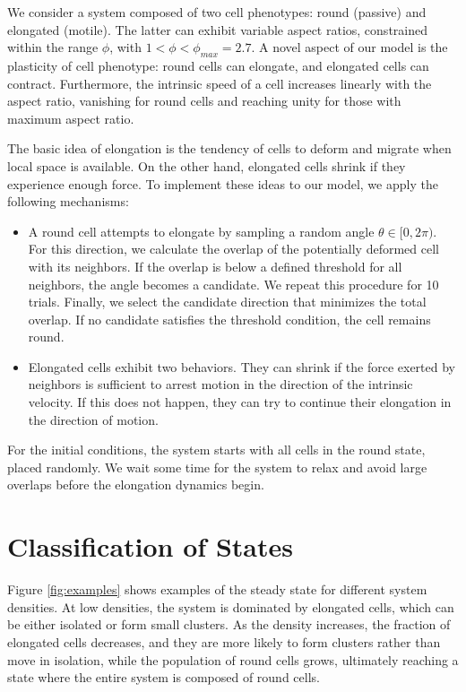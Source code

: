 \documentclass[%
reprint,
amsmath,amssymb,
aps,
]{revtex4-2}
\begin{document}
	We consider a system composed of two cell phenotypes: round (passive) and elongated (motile). The latter can exhibit variable aspect ratios, constrained within the range $\phi$, with $1<\phi<\phi_{max}=2.7$. A novel aspect of our model is the plasticity of cell phenotype: round cells can elongate, and elongated cells can contract. Furthermore, the intrinsic speed of a cell increases linearly with the aspect ratio, vanishing for round cells and reaching unity for those with maximum aspect ratio.
	
	The basic idea of elongation is the tendency of cells to deform and migrate when local space is available. On the other hand, elongated cells shrink if they experience enough force. To implement these ideas to our model, we apply the following mechanisms:
	
	\begin{itemize}
		\item A round cell attempts to elongate by sampling a random angle $\theta \in [0, 2 \pi) $. For this direction, we calculate the overlap of the potentially deformed cell with its neighbors. If the overlap is below a defined threshold for all neighbors, the angle becomes a candidate. We repeat this procedure for 10 trials. Finally, we select the candidate direction that minimizes the total overlap. If no candidate satisfies the threshold condition, the cell remains round.
		\item Elongated cells exhibit two behaviors. They can shrink if the force exerted by neighbors is sufficient to arrest motion in the direction of the intrinsic velocity. If this does not happen, they can try to continue their elongation in the direction of motion.
	\end{itemize}
	

	For the initial conditions, the system starts with all cells in the round state, placed randomly. We wait some time for the system to relax and avoid large overlaps before the elongation dynamics begin. 
	
	\section{\label{sec:level2} Classification of States}
	
	
	Figure \ref{fig:examples} shows examples of the steady state for different system densities. At low densities, the system is dominated by elongated cells, which can be either isolated or form small clusters. As the density increases, the fraction of elongated cells decreases, and they are more likely to form clusters rather than move in isolation, while the population of round cells grows, ultimately reaching a state where the entire system is composed of round cells.
	
\end{document}
